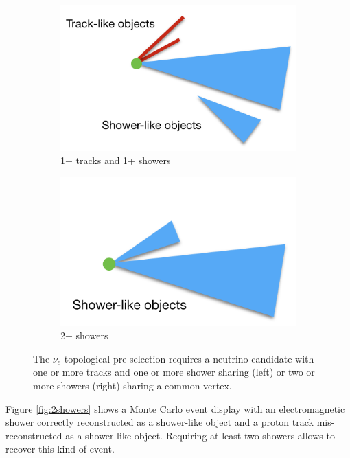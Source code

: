 \begin{figure}[htbp]
\centering
  \begin{subfigure}{0.4\textwidth}
    \includegraphics[width=\linewidth]{figures/trsh.png}
    \caption{1+ tracks and 1+ showers} 
  \end{subfigure}
    \begin{subfigure}{0.4\textwidth}
    \includegraphics[width=\linewidth]{figures/sh.png}
    \caption{2+ showers} 
  \end{subfigure}
  \caption{The $\nu_{e}$ topological pre-selection requires a neutrino candidate with one or more tracks and one or more shower sharing (left) or two or more showers (right) sharing  a common vertex.}\label{fig:dia}
\end{figure}

Figure \ref{fig:2showers} shows a Monte Carlo event display with an electromagnetic shower correctly reconstructed as a shower-like object and a proton track mis-reconstructed as a shower-like object. Requiring at least two showers allows to recover this kind of event.

